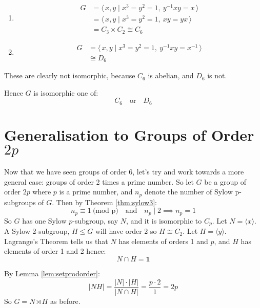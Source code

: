 \documentclass[a4paper, oneside, 12pt, final]{article}
\theoremstyle{definition}
\begin{document}
\begin{enumerate}
    \item
        \begin{equation*}
        \begin{aligned}
            G &= \langle\, x, y \mid x^3 = y^2 = 1,\ y^{-1}xy = x \,\rangle \\
            &=\langle\, x, y \mid x^3 = y^2 = 1,\ xy = yx \,\rangle \\
            &= C_3 \times C_2 \cong C_6
        \end{aligned}
        \end{equation*}

    \item
        \begin{equation*}
        \begin{aligned}
            G &= \langle\, x, y \mid x^3 = y^2 = 1,\ y^{-1}xy = x^{-1}
            \,\rangle \\
            &\cong D_6
        \end{aligned}
        \end{equation*}
\end{enumerate}

These are clearly not isomorphic, because \(C_6\) is abelian, and \(D_6\) is not.

Hence \(G\) is isomorphic one of:
\[C_6 \quad \text{or} \quad D_6\]

\section{Generalisation to Groups of Order \(2p\)}
Now that we have seen groups of order 6, let's try and work towards a more general case: groups of
order 2 times a prime number.
So let \(G\) be a group of order \(2p\) where \(p\) is a prime number, and \(n_p\) denote the number
of Sylow p-subgroups of \(G\).
Then by Theorem \ref{thm:sylow3}:
\[n_p \equiv 1 \ \text{(mod p)} \quad \text{and} \quad n_p \mid 2 \implies n_p = 1\]
So \(G\) has one Sylow \(p\)-subgroup, say \(N\), and it is isomorphic to \(C_p\).
Let \(N = \langle x \rangle\).
A Sylow 2-subgroup, \(H \leqslant G\) will have order 2 so \(H \cong C_2\).
Let \(H = \langle y \rangle\).
Lagrange's Theorem tells us that \(N\) has elements of orders 1 and \(p\), and \(H\) has elements of
order 1 and 2 hence:
\[N \cap H = \bm{1}\]

By Lemma \ref{lem:setprodorder}:
\[|NH| = \frac{|N| \cdot |H|}{|N \cap H|} = \frac{p \cdot 2}{1} = 2p\]
So \(G = N \rtimes H\) as before.
\end{document}
